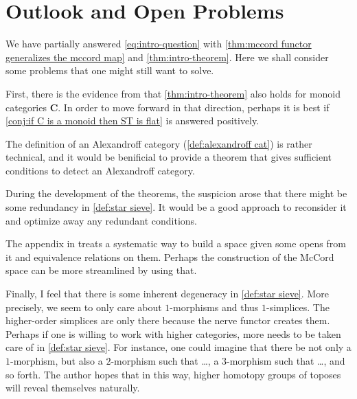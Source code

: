 %
%

\chapter{Outlook and Open Problems}

We have partially answered \cref{eq:intro-question} with \cref{thm:mccord functor generalizes the mccord map} and \cref{thm:intro-theorem}. Here we shall consider some problems that one might still want to solve.

\bigskip

First, there is the evidence from \cite{lenz2011} that \cref{thm:intro-theorem} also holds for monoid categories $\mathbf{C}$.
In order to move forward in that direction, perhaps it is best if \cref{conj:if C is a monoid then ST is flat} is answered positively.

\bigskip

The definition of an Alexandroff category (\cref{def:alexandroff cat}) is rather technical, and it would be benificial to provide a theorem that gives sufficient conditions to detect an Alexandroff category.

\bigskip

During the development of the theorems, the suspicion arose that there might be some redundancy in \cref{def:star sieve}. It would be a good approach to reconsider it and optimize away any redundant conditions.

\bigskip

The appendix in \cite{AlgebraicTopologyBible} treats a systematic way to build a space given some opens from it and equivalence relations on them. Perhaps the construction of the McCord space can be more streamlined by using that.

\bigskip

Finally, I feel that there is some inherent degeneracy in \cref{def:star sieve}. More precisely, we seem to only care about $1$-morphisms and thus $1$-simplices. The higher-order simplices are only there because the nerve functor creates them. Perhaps if one is willing to work with higher categories, more needs to be taken care of in \cref{def:star sieve}. For instance, one could imagine that there be not only a $1$-morphism, but also a $2$-morphism such that \ldots, a $3$-morphism such that \ldots, and so forth. The author hopes that in this way, higher homotopy groups of toposes will reveal themselves naturally.